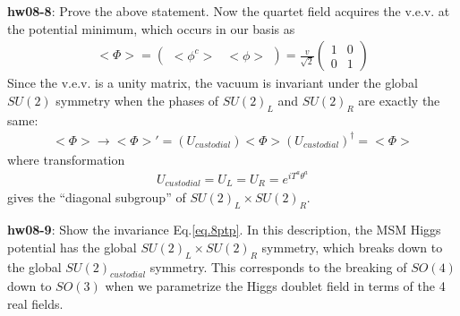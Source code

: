 \documentclass[12pt]{article}
\begin{document}
{\bf hw08-8}: Prove the above statement.
  Now the quartet field acquires the v.e.v. at the potential
  minimum, which occurs in our basis as
\begin{eqnarray}
  < \Phi >=
  \begin{pmatrix}
    <\phi^c> & <\phi> 
  \end{pmatrix}
  =\frac{v}{\sqrt 2}
  \begin{pmatrix}
    1&0 \\0 &1
  \end{pmatrix}
\end{eqnarray}
  Since the v.e.v. is a unity matrix, the vacuum is invariant under
  the global $SU(2)$ symmetry when the phases of $SU(2)_L$ and $SU(2)_R$
  are exactly the same:
\begin{eqnarray}
  <\Phi> \to <\Phi>'
             = (U_{custodial}) <\Phi> (U_{custodial})^\dagger
             = <\Phi> \label{eq.8ptp}
\end{eqnarray}
  where transformation
  \begin{eqnarray}
    U_{custodial} = U_L = U_R = e^{ i T^a \theta^a }
  \end{eqnarray}
  gives the ``diagonal subgroup'' of $SU(2)_L \times SU(2)_R$.

{\bf hw08-9}: Show the invariance Eq.\ref{eq.8ptp}.
  In this description, the MSM Higgs potential has the global
  $SU(2)_L \times SU(2)_R$ symmetry, which breaks down to the global
  $SU(2)_{custodial}$ symmetry.  This corresponds to the breaking of
  $SO(4)$ down to $SO(3)$ when we parametrize the Higgs doublet field
  in terms of the 4 real fields.
\end{document}
